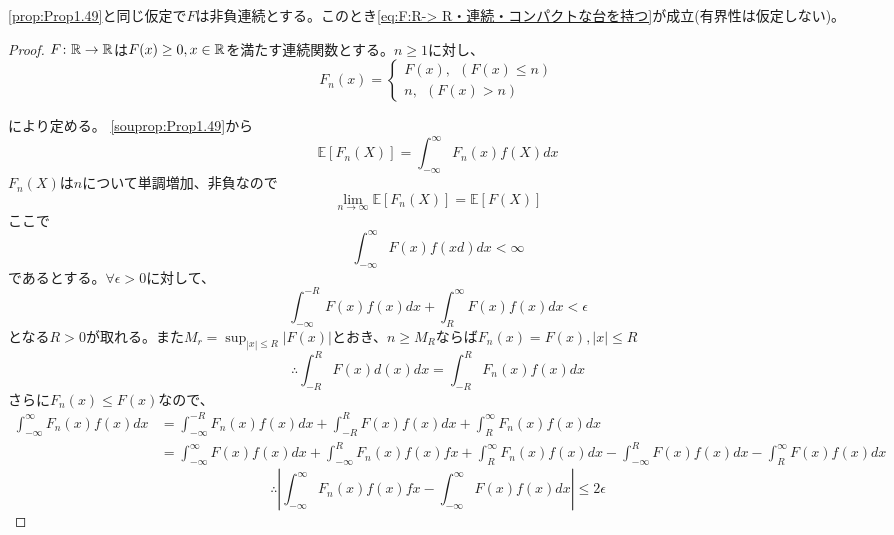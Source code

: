 \documentclass[dvipdfmx, leqno]{jsbook}
\begin{document}
\begin{souprop}
    \cref{prop:Prop1.49}と同じ仮定で$F$は非負連続とする。このとき\eqref{eq:F:R-> R・連続・コンパクトな台を持つ}が成立(有界性は仮定しない)。
\end{souprop}
\begin{proof}
    $F\colon \mathbb{R}\to \mathbb{R}$は$F(x)\ge 0, x\in \mathbb{R}$を満たす連続関数とする。$n\ge 1$に対し、
\begin{equation}
    F_n(x)
    = 
\begin{cases}
    F(x),\ \ (F(x)\le n)\\
    n,\ \ (F(x)> n)
\end{cases}
\end{equation}
\begin{tikzpicture}
\end{tikzpicture}
    により定める。
    \cref{souprop:Prop1.49}から
\begin{equation}
    \mathbb{E}[F_n(X)]= \int_{-\infty}^\infty F_n(x)f(X)dx
\end{equation}
    $F_n(X)$は$n$について単調増加、非負なので
\begin{equation}
    \lim_{n\to \infty} \mathbb{E}[F_n(X)]= \mathbb{E}[F(X)]
\end{equation}
    ここで
\begin{equation}
    \int_{-\infty}^\infty F(x)f(xd)dx< \infty
\end{equation}
    であるとする。$\forall \epsilon> 0$に対して、
\begin{equation}
    \int_{-\infty}^{-R} F(x)f(x)dx+ \int_R^\infty F(x)f(x)dx< \epsilon
\end{equation}
    となる$R> 0$が取れる。また$M_r= \sup_{|x|\le R} |F(x)|$とおき、$n\ge M_R$ならば$F_n(x)= F(x), |x|\le R$
\begin{equation}
    \therefore \int_{-R}^R F(x)d(x)dx= \int_{-R}^R F_n(x)f(x)dx
\end{equation}
    さらに$F_n(x)\le F(x)$なので、
\begin{align}
    \int_{-\infty}^\infty F_n(x)f(x)dx
    &= \int_{-\infty}^{-R} F_n(x)f(x)dx+ \int_{-R}^R F(x)f(x)dx+ \int_R^\infty F_n(x)f(x)dx\\
    &= \int_{-\infty}^\infty F(x)f(x)dx+ \int_{-\infty}^R F_n(x)f(x)fx+ \int_R^\infty F_n(x)f(x)dx- \int_{-\infty}^R F(x)f(x)dx- \int_R^\infty F(x)f(x)dx
\end{align}
\begin{equation}
    \therefore \left|\int_{-\infty}^\infty F_n(x)f(x)fx- \int_{-\infty}^\infty F(x)f(x)dx\right|\le 2\epsilon

\end{equation}
\end{proof}
\end{document}
